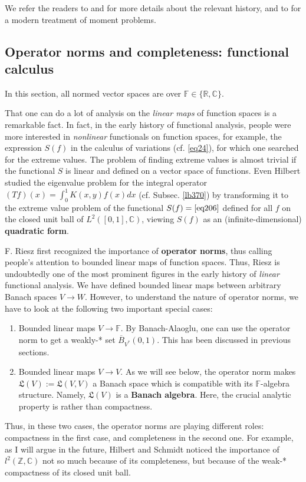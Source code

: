 \documentclass[12pt,b5paper,notitlepage]{article}
\theoremstyle{definition}
\theoremstyle{plain}
\newcommand{\fk}{\mathfrak}
\newcommand{\ovl}{\overline}
\newcommand{\Cbb}{\mathbb C}
\newcommand{\Zbb}{\mathbb Z}
\newcommand{\Rbb}{\mathbb R}
\newcommand{\Fbb}{\mathbb F}
\numberwithin{equation}{section}
\begin{document}
We refer the readers to \cite[Ch. VI]{Die-H} and \cite{NB97} for more details about the relevant history, and to \cite[Sec. 4.17 \& 5.6]{Sim-R} for a modern treatment of moment problems.



\subsection{Operator norms and completeness: functional calculus}


In this section, all normed vector spaces are over $\Fbb\in\{\Rbb,\Cbb\}$.

That one can do a lot of analysis on the \textit{linear maps} of function spaces is a remarkable fact. In fact, in the early history of functional analysis, people were more interested in \textit{nonlinear} functionals on function spaces, for example, the expression $S(f)$ in the calculus of variations (cf. \eqref{eq24}), for which one searched for the extreme values. The problem of finding extreme values is almost trivial if the functional $S$ is linear and defined on a vector space of functions. Even Hilbert studied the eigenvalue problem for the integral operator $(Tf)(x)=\int_0^1 K(x,y)f(x)dx$ (cf. Subsec. \ref{lb370}) by transforming it to the extreme value problem of the functional $S(f)=\eqref{eq206}$ defined for all $f$ on the closed unit ball of $L^2([0,1],\Cbb)$, viewing $S(f)$ as an (infinite-dimensional) \textbf{quadratic form}.



F. Riesz first recognized the importance of \textbf{operator norms}, thus calling people's attention to bounded linear maps of function spaces. Thus, Riesz is undoubtedly one of the most prominent figures in the early history of \textit{linear} functional analysis. We have defined bounded linear maps between arbitrary Banach spaces $V\rightarrow W$. However, to understand the nature of operator norms, we have to look at the following two important special cases:
\begin{enumerate}[label=(\arabic*)]
\item Bounded linear maps $V\rightarrow\Fbb$. By Banach-Alaoglu, one can use the operator norm to get a weakly-*  set $\ovl B_{V^*}(0,1)$. This has been discussed in previous sections.
\item Bounded linear maps $V\rightarrow V$. As we will see below, the operator norm makes $\fk L(V):=\fk L(V,V)$ a Banach space which is compatible with its $\Fbb$-algebra structure. Namely, $\fk L(V)$ is a \textbf{Banach algebra}. Here, the crucial analytic property is  rather than compactness. 
\end{enumerate} 
Thus, in these two cases, the operator norms are playing different roles: compactness in the first case, and completeness in the second one. For example, as I will argue in the future, Hilbert and Schmidt noticed the importance of $l^2(\Zbb,\Cbb)$ not so much because of its completeness, but because of the weak-* compactness of its closed unit ball.
\end{document}
